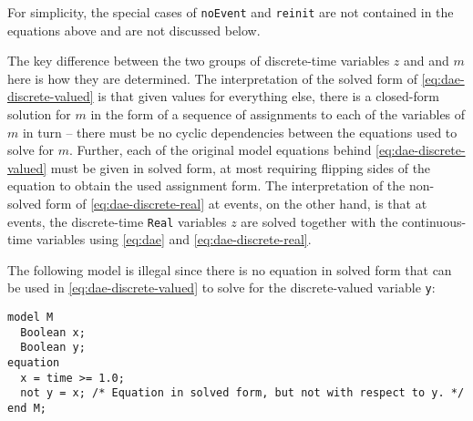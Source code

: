 For simplicity, the special cases of \lstinline!noEvent! and \lstinline!reinit! are not contained in the equations
above and are not discussed below.

The key difference between the two groups of discrete-time variables $z$ and and $m$ here is how they are determined.  The interpretation of the solved form of \eqref{eq:dae-discrete-valued} is that given values for everything else, there is a closed-form solution for $m$ in the form of a sequence of assignments to each of the variables of $m$ in turn -- there must be no cyclic dependencies between the equations used to solve for $m$.  Further, each of the original model equations behind \eqref{eq:dae-discrete-valued} must be given in solved form, at most requiring flipping sides of the equation to obtain the used assignment form.  The interpretation of the non-solved form of \eqref{eq:dae-discrete-real} at events, on the other hand, is that at events, the discrete-time \lstinline!Real! variables $z$ are solved together with the continuous-time variables using \eqref{eq:dae} and \eqref{eq:dae-discrete-real}.

\begin{example}
The following model is illegal since there is no equation in solved form that can be used in \eqref{eq:dae-discrete-valued} to solve for the discrete-valued variable \lstinline!y!:
\begin{lstlisting}[language=modelica]
model M
  Boolean x;
  Boolean y;
equation
  x = time >= 1.0;
  not y = x; /* Equation in solved form, but not with respect to y. */
end M;
\end{lstlisting}
\end{example}

